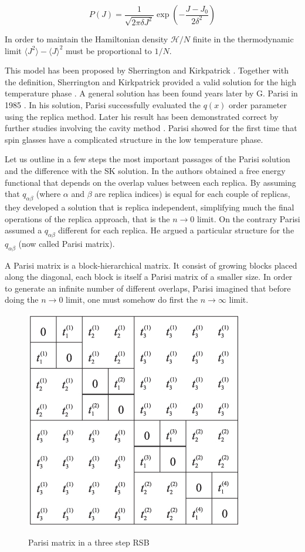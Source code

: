 \begin{equation}
P(J) = \frac{1}{\sqrt{2 \pi {\delta J}^2}}\exp(-\frac{J-J_0}{2\delta^2})
\end{equation}

In order to maintain the Hamiltonian density $\mathcal{H}/N$ finite in the thermodynamic limit $\langle J^2\rangle-\langle J \rangle^2$ must be proportional to $1/N$.

This model has been proposed by Sherrington and Kirkpatrick \cite{SK}. Together with the definition, Sherrington and Kirkpatrick provided a valid solution for the high temperature phase \cite{SK2}. A general solution has been found years later by G. Parisi in 1985 \cite{beyond}.
In his solution, Parisi successfully evaluated the $q(x)$ order parameter using the replica method. Later his result has been demonstrated correct by further studies involving the cavity method \cite{guerra}.
Parisi showed for the first time that spin glasses have a complicated structure in the low temperature phase.

Let us outline in a few steps the most important passages of the Parisi solution and the difference with the SK solution. In \cite{SK2} the authors obtained a free energy functional that depends on the overlap values between each replica. By assuming that $q_{\alpha\beta}$ (where $\alpha$ and $\beta$ are replica indices) is equal for each couple of replicas, they developed a solution that is replica independent, simplifying much the final operations of the replica approach, that is the $n\rightarrow 0$ limit.
On the contrary Parisi assumed a $q_{\alpha\beta}$ different for each replica. He argued a particular structure for the $q_{\alpha\beta}$ (now called Parisi matrix).

A Parisi matrix is a block-hierarchical matrix. It consist of growing blocks placed along the diagonal, each block is itself a Parisi matrix of a smaller size. In order to generate an infinite number of different overlaps, Parisi imagined that before doing the $n\rightarrow 0$ limit, one must somehow do first the $n\rightarrow \infty$ limit.

\begin{figure}[h]
  \centering
  \includegraphics[scale =0.6]{img/matrix.png}\\
  \caption{Parisi matrix in a three step RSB}\label{}
\end{figure}

